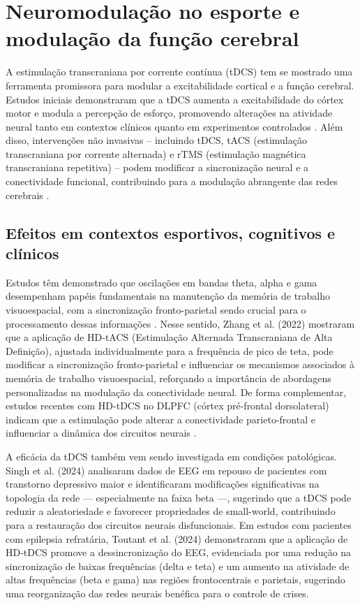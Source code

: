\section{Neuromodulação no esporte e modulação da função cerebral}

A estimulação transcraniana por corrente contínua (tDCS) tem se mostrado uma ferramenta promissora para modular a excitabilidade cortical e a função cerebral. Estudos iniciais demonstraram que a tDCS aumenta a excitabilidade do córtex motor e modula a percepção de esforço, promovendo alterações na atividade neural tanto em contextos clínicos quanto em experimentos controlados \cite{nitsche2000excitability, okano2013estimulacao}. Além disso, intervenções não invasivas – incluindo tDCS, tACS (estimulação transcraniana por corrente alternada) e rTMS (estimulação magnética transcraniana repetitiva) – podem modificar a sincronização neural e a conectividade funcional, contribuindo para a modulação abrangente das redes cerebrais \cite{scheler2019neuromodulation, kunze2014high}.

\subsection{Efeitos em contextos esportivos, cognitivos e clínicos}

Estudos têm demonstrado que oscilações em bandas theta, alpha e gama desempenham papéis fundamentais na manutenção da memória de trabalho visuoespacial, com a sincronização fronto-parietal sendo crucial para o processamento dessas informações \cite{fell2011, fries2015, palva2010}. Nesse sentido, Zhang et al. (2022) \cite{zhang2022theta} mostraram que a aplicação de HD-tACS (Estimulação Alternada Transcraniana de Alta Definição), ajustada individualmente para a frequência de pico de teta, pode modificar a sincronização fronto-parietal e influenciar os mecanismos associados à memória de trabalho visuoespacial, reforçando a importância de abordagens personalizadas na modulação da conectividade neural. De forma complementar, estudos recentes com HD-tDCS no DLPFC (córtex pré-frontal dorsolateral) indicam que a estimulação pode alterar a conectividade parieto-frontal e influenciar a dinâmica dos circuitos neurais \cite{arif2021high}.

A eficácia da tDCS também vem sendo investigada em condições patológicas. Singh et al. (2024) \cite{singh2024evaluating} analisaram dados de EEG em repouso de pacientes com transtorno depressivo maior e identificaram modificações significativas na topologia da rede — especialmente na faixa beta —, sugerindo que a tDCS pode reduzir a aleatoriedade e favorecer propriedades de small-world, contribuindo para a restauração dos circuitos neurais disfuncionais. Em estudos com pacientes com epilepsia refratária, Toutant et al. (2024) \cite{toutant2024hdtdcs} demonstraram que a aplicação de HD‑tDCS promove a dessincronização do EEG, evidenciada por uma redução na sincronização de baixas frequências (delta e teta) e um aumento na atividade de altas frequências (beta e gama) nas regiões frontocentrais e parietais, sugerindo uma reorganização das redes neurais benéfica para o controle de crises.

